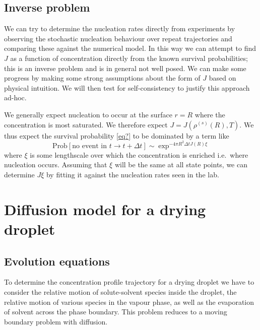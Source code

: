 \documentclass[11pt,twoside]{report}
\begin{document}
\subsection{Inverse problem}

We can try to determine the nucleation rates directly from experiments by observing the stochastic nucleation behaviour over repeat trajectories and comparing these against the numerical model.
In this way we can attempt to find $J$ as a function of concentration directly from the known survival probabilities; this is an inverse problem and is in general not well posed.
We can make some progress by making some strong assumptions about the form of $J$ based on physical intuition.
We will then test for self-consistency to justify this approach ad-hoc.

We generally expect nucleation to occur at the surface $r = R$ where the concentration is most saturated.
We therefore expect $J = J(\rho^{(s)}(R), T)$.
We thus expect the survival probability \eqref{eq?} to be dominated by a term like
\begin{equation}
  \textrm{Prob}\left[ \textrm{no event in } t \to t + \Delta t \right]
  \sim
  \exp^{-4\pi R^2 \Delta t J(R) \xi}
\end{equation}
where $\xi$ is some lengthscale over which the concentration is enriched i.e.\ where nucleation occurs.
Assuming that $\xi$ will be the same at all state points, we can determine $J \xi$ by fitting it against the nucleation rates seen in the lab.

\section{Diffusion model for a drying droplet}

\subsection{Evolution equations}

To determine the concentration profile trajectory for a drying droplet we have to consider the relative motion of solute-solvent species inside the droplet, the relative motion of various species in the vapour phase, as well as the evaporation of solvent across the phase boundary.
This problem reduces to a moving boundary problem with diffusion.
\end{document}
